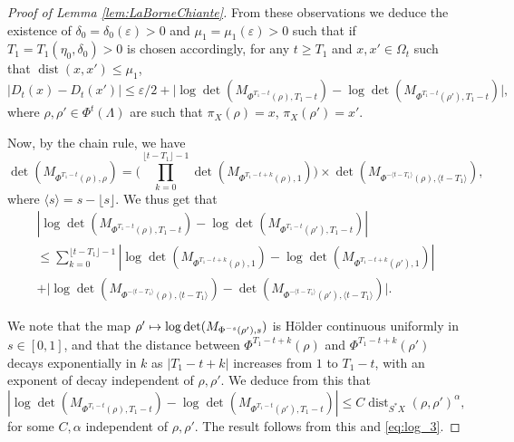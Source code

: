 \documentclass[JEP,XML,SOM,Unicode,published]{cedram}
\newcommand\mto{\mathchoice{\longmapsto}{\mapsto}{\mapsto}{\mapsto}}
\DeclareMathOperator{\dist}{dist}
\theoremstyle{plain}
\theoremstyle{definition}
\begin{document}
\begin{proof}[Proof of Lemma \ref{lem:LaBorneChiante}]
From these observations we deduce the existence of $\delta_0=\delta_0(\varepsilon)>0$ and $\mu_1=\mu_1(\varepsilon)>0$ such that if $T_1=T_1(\eta_0,\delta_0)>0$ is chosen accordingly, for any $t\geq T_1$ and $x,x'\in\Omega_t$ such that $\dist(x,x')\leq\mu_1$,\vspace*{-3pt}
\begin{equation}\label{eq:log_3}
|D_t(x)-D_t(x')|\leq \varepsilon/2+\bigl|\log \det(M_{\Phi^{T_1-t}(\rho), T_1-t}) - \log \det(M_{\Phi^{T_1-t}(\rho'), T_1-t}) \bigr|,
\end{equation}
where $\rho,\rho'\in \Phi^t(\Lambda)$ are such that $\pi_X(\rho)= x$, $\pi_X(\rho')=x'$.

Now, by the chain rule, we have\vspace*{-1pt}
\[
\det(M_{\Phi^{T_1-t}(\rho), \rho}) = \biggl(\prod_{k=0}^{\lfloor t- T_1 \rfloor- 1} \det(M_{\Phi^{T_1-t+k}(\rho), 1}) \biggr) \times \det(M_{\Phi^{ - \langle t- T_1\rangle }(\rho), \langle t- T_1\rangle }),
\]
where $\langle s\rangle = s- \lfloor s \rfloor$. We thus get that\vspace*{-3pt}
\begin{multline*}
\left|\log \det(M_{\Phi^{T_1-t}(\rho), T_1-t}) - \log \det(M_{\Phi^{T_1-t}(\rho'), T_1-t}) \right| \\
\leq \sum_{k=0}^{\lfloor t- T_1 \rfloor- 1} \left|\log \det(M_{\Phi^{T_1-t+k}(\rho), 1}) - \log \det(M_{\Phi^{T_1-t+k}(\rho'), 1})\right| \\[-5pt]
+ \bigl|\log \det(M_{\Phi^{ - \langle t- T_1\rangle }(\rho), \langle t- T_1\rangle }) - \det(M_{\Phi^{ - \langle t- T_1\rangle }(\rho'), \langle t- T_1\rangle })\bigr|.
\end{multline*}

We note that the map $\rho'\mto \log \det(M_{\Phi^{ - s }(\rho'), s })$ is Hölder continuous uniformly in $s\in[0,1]$, and that the distance between $\Phi^{T_1-t+k}(\rho)$ and $\Phi^{T_1-t+k}(\rho')$ decays exponentially in $k$ as $|T_1-t+k|$ increases from $1$ to $T_1-t$, with an exponent of decay independent of $\rho, \rho'$. We deduce from this that
\[
\left|\log \det(M_{\Phi^{T_1-t}(\rho), T_1-t}) - \log \det(M_{\Phi^{T_1-t}(\rho'), T_1-t}) \right| \leq C \dist_{S^*X}(\rho, \rho')^\alpha,
\]
for some $C,\alpha$ independent of $\rho, \rho'$. The result follows from this and \eqref{eq:log_3}.
\end{proof}
\end{document}
